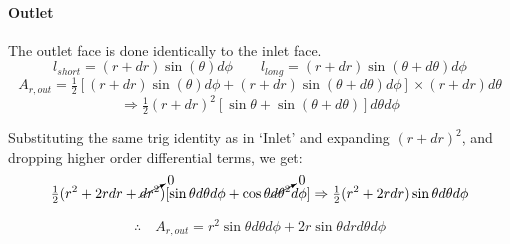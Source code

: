 \documentclass[12pt, letterpaper, twoside]{article}
\begin{document}
        \paragraph{Outlet}
            The outlet face is done identically to the inlet face.
            \begin{equation*}
                l_{short} = (r + dr)\sin(\theta) d\phi  \qquad
                l_{long} = (r + dr)\sin(\theta + d\theta) d\phi
            \end{equation*}
            \begin{equation}
                A_{r,out} = \tfrac{1}{2} [(r + dr)\sin(\theta) d\phi + (r + dr)\sin(\theta + d\theta) d\phi] \times (r + dr)d\theta
                \label{eq:Arout_init}
            \end{equation}
            \begin{equation*}
                \Rightarrow
                \tfrac{1}{2} (r + dr)^2 [ \sin\theta + \sin (\theta + d\theta)] d\theta d\phi
            \end{equation*}

            Substituting the same trig identity as in `Inlet' and expanding \((r + dr)^2\), and dropping higher order differential terms, we get:
            \begin{equation*}
                \tfrac{1}{2} (r^2 + 2rdr + \cancelto{0}{dr^2}) [\sin\theta d\theta d\phi + \cos\theta \cancelto{0}{d\theta^2} d\phi]
                \Rightarrow \tfrac{1}{2} (r^2 + 2rdr) \sin\theta d\theta d\phi
            \end{equation*}

            \begin{equation}
                \therefore\quad A_{r,out} = r^2 \sin\theta d\theta d\phi + 
                2r\sin\theta drd\theta d\phi
                \label{eq:Arout_final}
            \end{equation}
\end{document}

